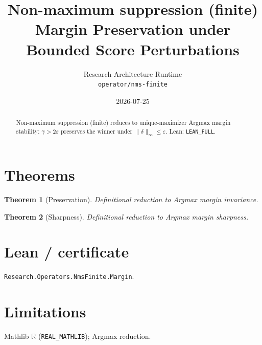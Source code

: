 \documentclass[11pt]{article}
\title{Non-maximum suppression (finite) Margin Preservation under Bounded Score Perturbations}
\author{Research Architecture Runtime \\ \texttt{operator/nms-finite}}
\date{2026-07-25}
\newtheorem{theorem}{Theorem}
\begin{document}
\maketitle
\begin{abstract}
Non-maximum suppression (finite) reduces to unique-maximizer Argmax margin stability: $\gamma>2\varepsilon$
preserves the winner under $\|\delta\|_\infty\le\varepsilon$. Lean: \texttt{LEAN\_FULL}.
\end{abstract}
\section{Theorems}
\begin{theorem}[Preservation]
Definitional reduction to Argmax margin invariance.
\end{theorem}
\begin{theorem}[Sharpness]
Definitional reduction to Argmax margin sharpness.
\end{theorem}
\section{Lean / certificate}
\texttt{Research.Operators.NmsFinite.Margin}.
\section{Limitations}
Mathlib $\mathbb{R}$ (\texttt{REAL\_MATHLIB}); Argmax reduction.
\end{document}
